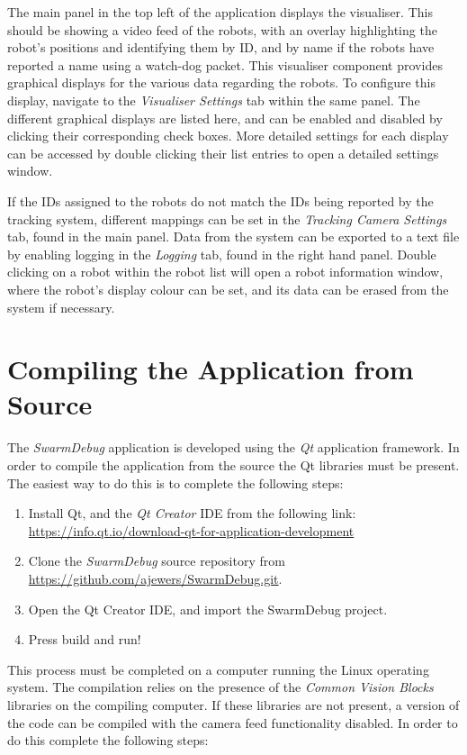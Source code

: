 The main panel in the top left of the application displays the visualiser. This should be showing a video feed of the robots, with an overlay highlighting the robot's positions and identifying them by ID, and by name if the robots have reported a name using a watch-dog packet. This visualiser component provides graphical displays for the various data regarding the robots. To configure this display, navigate to the \textit{Visualiser Settings} tab within the same panel. The different graphical displays are listed here, and can be enabled and disabled by clicking their corresponding check boxes. More detailed settings for each display can be accessed by double clicking their list entries to open a detailed settings window.

If the IDs assigned to the robots do not match the IDs being reported by the tracking system, different mappings can be set in the \textit{Tracking Camera Settings} tab, found in the main panel. Data from the system can be exported to a text file by enabling logging in the \textit{Logging} tab, found in the right hand panel. Double clicking on a robot within the robot list will open a robot information window, where the robot's display colour can be set, and its data can be erased from the system if necessary.

\section{Compiling the Application from Source}

The \textit{SwarmDebug} application is developed using the \textit{Qt} application framework. In order to compile the application from the source the Qt libraries must be present. The easiest way to do this is to complete the following steps:

\begin{enumerate}
 \item Install Qt, and the \textit{Qt Creator} IDE from the following link: \url{https://info.qt.io/download-qt-for-application-development}
 \item Clone the \textit{SwarmDebug} source repository from \url{https://github.com/ajewers/SwarmDebug.git}.
 \item Open the Qt Creator IDE, and import the SwarmDebug project.
 \item Press build and run!
\end{enumerate}

This process must be completed on a computer running the Linux operating system. The compilation relies on the presence of the \textit{Common Vision Blocks} libraries on the compiling computer. If these libraries are not present, a version of the code can be compiled with the camera feed functionality disabled. In order to do this complete the following steps:

